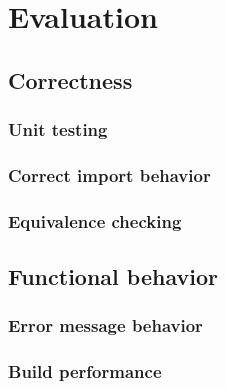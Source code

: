 
\chapter{\label{chap:evaluation}Evaluation}

\section{Correctness}

\subsection{Unit testing}

\subsection{Correct import behavior}

\subsection{Equivalence checking}

\section{Functional behavior}

\subsection{Error message behavior}

\subsection{Build performance}